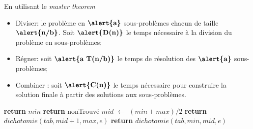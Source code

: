 \documentclass[10pt,xcolor=dvipsnames]{beamer}
\newcommand*\Let[2]{\State #1 $\gets$ #2}
\begin{document}
\begin{frame}{En utilisant le \textit{master theorem}}
\begin{minipage}{.39\linewidth}
  \begin{itemize}
    \item \alert{Diviser}: le problème en $\textbf{\alert{a}}$ sous-problèmes chacun de taille $\textbf{\alert{n/b}}$. Soit $\textbf{\alert{D(n)}}$ le temps nécessaire à la division du problème en sous-problèmes;
    \item \alert{Régner}: soit $\textbf{\alert{a T(n/b)}}$ le temps de résolution des $\textbf{\alert{a}}$ sous-problèmes;
    \item \alert{Combiner} : soit $\textbf{\alert{C(n)}}$ le temps nécessaire pour construire la solution finale à partir des solutions aux sous-problèmes.
\end{itemize}
\end{minipage}
\begin{minipage}{.59\linewidth}
  \begin{algorithmic}[1]
        
                \State \textbf{return} $min$
            \EndIf
        \Else
            \State \textbf{return} nonTrouvé
        \EndIf
    \Let{$mid$}{$( min + max ) / 2$}
        \State \textbf{return} $dichotomie(tab, mid+1, max, e)$
    \Else
        \State \textbf{return} $dichotomie(tab, min, mid, e)$
    \EndIf
    \EndFunction
  \end{algorithmic}
\end{minipage}

\end{frame}
\end{document}
